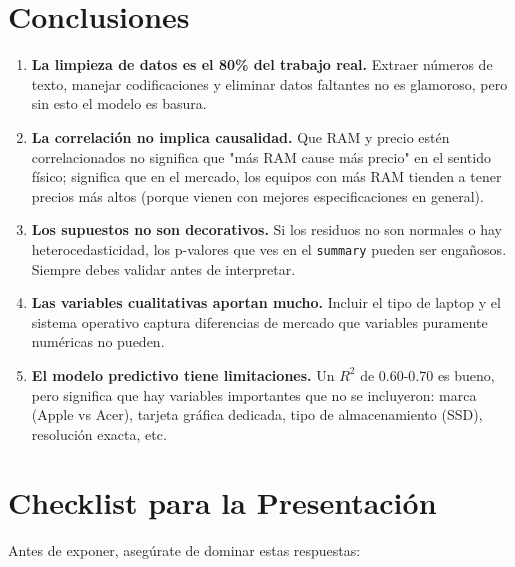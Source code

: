 \documentclass[12pt,a4paper]{article}
\begin{document}
\section{Conclusiones}

\begin{enumerate}
    \item \textbf{La limpieza de datos es el 80\% del trabajo real.} Extraer números de texto, manejar codificaciones y eliminar datos faltantes no es glamoroso, pero sin esto el modelo es basura.
    
    \item \textbf{La correlación no implica causalidad.} Que RAM y precio estén correlacionados no significa que "más RAM cause más precio" en el sentido físico; significa que en el mercado, los equipos con más RAM tienden a tener precios más altos (porque vienen con mejores especificaciones en general).
    
    \item \textbf{Los supuestos no son decorativos.} Si los residuos no son normales o hay heterocedasticidad, los p-valores que ves en el \texttt{summary} pueden ser engañosos. Siempre debes validar antes de interpretar.
    
    \item \textbf{Las variables cualitativas aportan mucho.} Incluir el tipo de laptop y el sistema operativo captura diferencias de mercado que variables puramente numéricas no pueden.
    
    \item \textbf{El modelo predictivo tiene limitaciones.} Un $R^2$ de 0.60-0.70 es bueno, pero significa que hay variables importantes que no se incluyeron: marca (Apple vs Acer), tarjeta gráfica dedicada, tipo de almacenamiento (SSD), resolución exacta, etc.
\end{enumerate}

\section{Checklist para la Presentación}

Antes de exponer, asegúrate de dominar estas respuestas:
\end{document}
